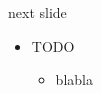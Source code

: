 \begin{Slide}{next slide}
\begin{itemize}
\item TODO
\begin{itemize}
\item blabla
\end{itemize}
\end{itemize}
\end{Slide}